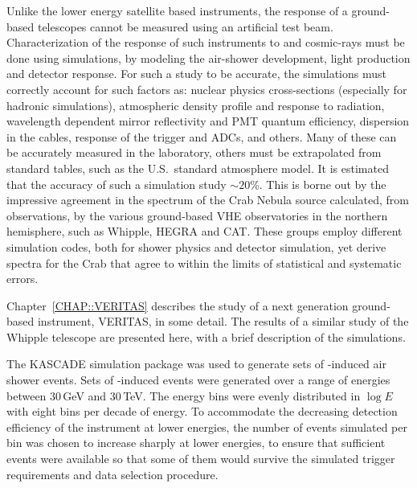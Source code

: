Unlike the lower energy satellite based \Gray instruments, the
response of a ground-based \Cerenkov telescopes cannot be measured
using an artificial test beam. Characterization of the response of
such instruments to \Grays and cosmic-rays must be done using
simulations, by modeling the air-shower development, \Cerenkov light
production and detector response. For such a study to be accurate, the
simulations must correctly account for such factors as: nuclear
physics cross-sections (especially for hadronic simulations),
atmospheric density profile and response to \Cerenkov radiation,
wavelength dependent mirror reflectivity and PMT quantum efficiency,
dispersion in the cables, response of the trigger and ADCs, and
others. Many of these can be accurately measured in the laboratory,
others must be extrapolated from standard tables, such as the U.S.\
standard atmosphere model. It is estimated that the accuracy of such a
simulation study $\sim20$\%. This is borne out by the impressive
agreement in the spectrum of the Crab Nebula source calculated, from
observations, by the various ground-based VHE observatories in the
northern hemisphere, such as Whipple, HEGRA and CAT. These groups
employ different simulation codes, both for shower physics and
detector simulation, yet derive spectra for the Crab that agree to
within the limits of statistical and systematic errors.

Chapter~\ref{CHAP::VERITAS} describes the study of a next generation
ground-based instrument, VERITAS, in some detail. The results of a
similar study of the Whipple telescope are presented here, with a
brief description of the simulations.

The KASCADE simulation package \citep{REF::KERTZMAN::1994NIMA} was used
to generate sets of {\Grayc}-induced air shower events. Sets of
{\Gray}-induced events were generated over a range of energies between
30\,GeV and 30\,TeV. The energy bins were evenly distributed in $\log
E$ with eight bins per decade of energy. To accommodate the decreasing
detection efficiency of the instrument at lower energies, the number
of events simulated per bin was chosen to increase sharply at lower
energies, to ensure that sufficient events were available so that some
of them would survive the simulated trigger requirements and data
selection procedure.

